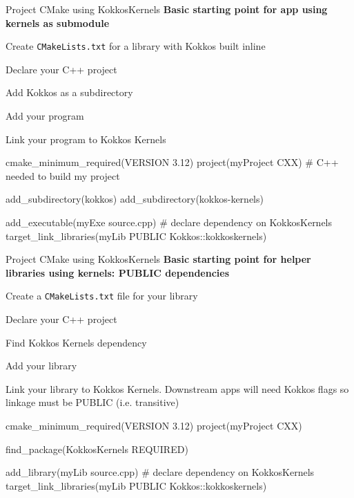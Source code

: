 \begin{frame}[fragile]{Project CMake using KokkosKernels}
\textbf{Basic starting point for app using kernels as submodule}
\begin{itemize}
\item Create \texttt{CMakeLists.txt} for a library with Kokkos built inline
 { \item Declare your C++ project }
 { \item Add Kokkos as a subdirectory }
 { \item Add your program  }
 { \item Link your program to Kokkos Kernels }
\end{itemize}

\begin{cmake}[linebackground={
  \btLstHL<2>{2}{orange!30}
  \btLstHL<3>{4-5}{orange!30}
  \btLstHL<4>{8}{orange!30}
  \btLstHL<5>{10-11}{orange!30}    
}]
    cmake_minimum_required(VERSION 3.12)
    project(myProject CXX) # C++ needed to build my project

    add_subdirectory(kokkos)
    add_subdirectory(kokkos-kernels)

    add_executable(myExe source.cpp)
    # declare dependency on KokkosKernels
    target_link_libraries(myLib PUBLIC 
                 Kokkos::kokkoskernels)
\end{cmake}
\end{frame}

\begin{frame}[fragile]{Project CMake using KokkosKernels}
\textbf{Basic starting point for helper libraries using kernels: PUBLIC dependencies}
\begin{itemize}
\item Create a \texttt{CMakeLists.txt} file for your library
 { \item Declare your C++ project }
 { \item Find Kokkos Kernels dependency }
 { \item Add your library  }
 { \item Link your library to Kokkos Kernels. Downstream apps will need Kokkos flags so linkage must be PUBLIC (i.e. transitive) }
\end{itemize}

\begin{cmake}[linebackground={
  \btLstHL<2>{2}{orange!30}
  \btLstHL<3>{4}{orange!30}
  \btLstHL<4>{7}{orange!30}
  \btLstHL<5>{9-10}{orange!30}    
}]
    cmake_minimum_required(VERSION 3.12)
    project(myProject CXX)

    find_package(KokkosKernels REQUIRED)

    add_library(myLib source.cpp)
    # declare dependency on KokkosKernels
    target_link_libraries(myLib PUBLIC 
                 Kokkos::kokkoskernels)
\end{cmake}
\end{frame}




